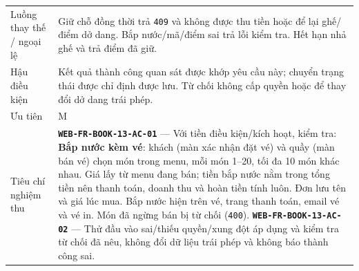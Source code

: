 \begin{longtable}{@{}P{0.23000\SRSWidth}P{0.77000\SRSWidth}@{}}
Luồng thay thế /\allowbreak{} ngoại lệ & Giữ chỗ đồng thời trả \texttt{409} và không được thu tiền hoặc để lại ghế/\allowbreak{}điểm dở dang. Bắp nước/\allowbreak{}mã/\allowbreak{}điểm sai trả lỗi kiểm tra. Hết hạn nhả ghế và trả điểm đã giữ. \\[3pt]
Hậu điều kiện & Kết quả thành công quan sát được khớp yêu cầu này; chuyển trạng thái được chỉ định được lưu. Từ chối không cấp quyền hoặc để thay đổi dở dang trái phép. \\[3pt]
Ưu tiên & M \\[3pt]
Tiêu chí nghiệm thu & \textbf{\texttt{WEB-\allowbreak{}FR-\allowbreak{}BOOK-\allowbreak{}13-\allowbreak{}AC-\allowbreak{}01}} — Với tiền điều kiện/\allowbreak{}kích hoạt, kiểm tra: \textbf{Bắp nước kèm vé}: khách (màn xác nhận đặt vé) và quầy (màn bán vé) chọn món trong menu, mỗi món 1–20, tối đa 10 món khác nhau. Giá lấy từ menu đang bán; tiền bắp nước nằm trong tổng tiền nên thanh toán, doanh thu và hoàn tiền tính luôn. Đơn lưu tên và giá lúc mua. Bắp nước hiện trên vé, trang thanh toán, email vé và vé in. Món đã ngừng bán bị từ chối (\texttt{400}). \textbf{\texttt{WEB-\allowbreak{}FR-\allowbreak{}BOOK-\allowbreak{}13-\allowbreak{}AC-\allowbreak{}02}} — Thử đầu vào sai/\allowbreak{}thiếu quyền/\allowbreak{}xung đột áp dụng và kiểm tra từ chối đã nêu, không đổi dữ liệu trái phép và không báo thành công sai. \\[3pt]

\end{longtable}
